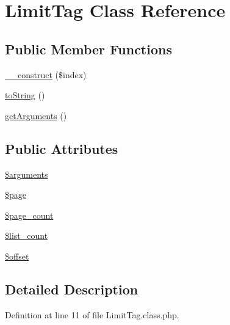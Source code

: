 \hypertarget{classLimitTag}{\section{Limit\-Tag Class Reference}
\label{classLimitTag}
}
\subsection*{Public Member Functions}
\begin{DoxyCompactItemize}
\item 
\hyperlink{classLimitTag_a8614d91fc652c410121bd3807caacdec}{\-\_\-\-\_\-construct} (\$index)
\item 
\hyperlink{classLimitTag_ae557d296324baf6a0381b18361353e85}{to\-String} ()
\item 
\hyperlink{classLimitTag_ad38599eb066d0e868cc7d584979db070}{get\-Arguments} ()
\end{DoxyCompactItemize}
\subsection*{Public Attributes}
\begin{DoxyCompactItemize}
\item 
\hyperlink{classLimitTag_aca5deed1e4200fbc10bf96b3af1bb0aa}{\$arguments}
\item 
\hyperlink{classLimitTag_aae0faff40b6bcd38d72350bd851ecd4b}{\$page}
\item 
\hyperlink{classLimitTag_a3d25270d024a280ac3e1cc7ada2c8fe0}{\$page\-\_\-count}
\item 
\hyperlink{classLimitTag_aec51c8433d2e7a1e009b7c331702cef0}{\$list\-\_\-count}
\item 
\hyperlink{classLimitTag_adbc76de9e00e8d0a724e49dec7e208ae}{\$offset}
\end{DoxyCompactItemize}


\subsection{Detailed Description}


Definition at line 11 of file Limit\-Tag.\-class.\-php.



